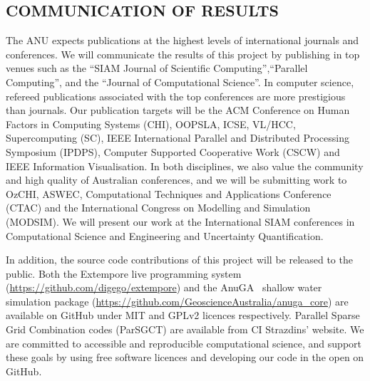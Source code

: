 \subsection*{COMMUNICATION OF RESULTS}

The ANU expects publications at the highest levels of international
journals and conferences. We will communicate the results of this
project by publishing in top venues such as the ``SIAM Journal of
Scientific Computing'',``Parallel Computing'', and the ``Journal of
Computational Science''. In computer science, refereed publications
associated with the top conferences are more prestigious than
journals. Our publication targets will be the ACM Conference on Human
Factors in Computing Systems (CHI), OOPSLA, ICSE, VL/HCC,
Supercomputing (SC), IEEE International Parallel and Distributed
Processing Symposium (IPDPS), Computer Supported Cooperative Work
(CSCW) and IEEE Information Visualisation. In both disciplines, we
also value the community and high quality of Australian conferences,
and we will be submitting work to OzCHI, ASWEC, Computational
Techniques and Applications Conference (CTAC) and the International 
Congress on Modelling and Simulation (MODSIM). We will present 
our work at the International SIAM conferences in Computational Science and Engineering and Uncertainty Quantification. 


In addition, the source code contributions of this project will be
released to the public. Both the Extempore live programming system
(\url{https://github.com/digego/extempore}) and the
 AnuGA~\parencite{anugamanual,nielsen2005hydrodynamic} 
shallow
water simulation package
(\url{https://github.com/GeoscienceAustralia/anuga_core}) are
available on GitHub under MIT and GPLv2 licences respectively.
Parallel Sparse Grid Combination codes (ParSGCT) are available from CI
Strazdins' website.  We are committed to accessible and reproducible
computational science, and support these goals by using free software
licences and developing our code in the open on GitHub.

